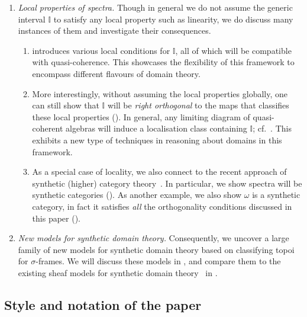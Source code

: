 \documentclass[a4paper,12pt]{amsart}
\theoremstyle{definition}
\newcommand{\mbb}[1]{\mathbb{#1}}
\newcommand{\I}{\mbb I}
\begin{document}
\begin{enumerate}[leftmargin=*]
  \item \emph{Local properties of spectra.} Though in general we do not assume the generic interval $\I$ to satisfy any local property such as linearity, we do discuss many instances of them and investigate their consequences.
  \begin{enumerate}

    \item {} introduces various local conditions for $\I$, all of which will be compatible with quasi-coherence. This showcases the flexibility of this framework to encompass different flavours of domain theory.

    \item  More interestingly, without assuming the local properties globally, one can still show that $\I$ will be \emph{right orthogonal} to the maps that classifies these local properties (). In general, any limiting diagram of quasi-coherent algebras will induce a localisation class containing $\I$; cf.\ . This exhibits a new type of techniques in reasoning about domains in this framework.
    
    \item As a special case of locality, we also connect to the recent approach of synthetic (higher) category theory~\cite{riehl2017type,buchholtz2021synthetic,gratzer2024directed}. In particular, we show spectra will be synthetic categories (). As another example, we also show $\omega$ is a synthetic category, in fact it satisfies \emph{all} the orthogonality conditions discussed in this paper (). 
  \end{enumerate}

  \item \emph{New models for synthetic domain theory.} Consequently, we uncover a large family of new models for synthetic domain theory based on classifying topoi for $\sigma$-frames. We will discuss these models in , and compare them to the existing sheaf models for synthetic domain theory~\cite{FIORE1997151} in .
\end{enumerate}






\subsection{Style and notation of the paper}
\end{document}
